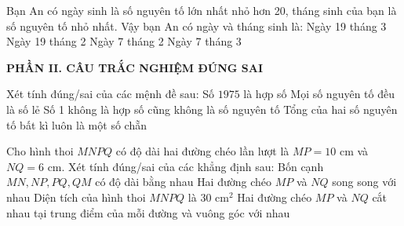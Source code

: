 \documentclass[12pt,a4paper]{article}
\begin{document}
\begin{ex}
Bạn An có ngày sinh là số nguyên tố lớn nhất nhỏ hơn 20, tháng sinh của bạn là số nguyên tố nhỏ nhất. Vậy bạn An có ngày và tháng sinh là:
\choice
{Ngày 19 tháng 3}
{\True Ngày 19 tháng 2}
{Ngày 7 tháng 2}
{Ngày 7 tháng 3}
\end{ex}


\setcounter{ex}{0}
\vspace{2mm}
\noindent\textbf{\large PHẦN II. CÂU TRẮC NGHIỆM ĐÚNG SAI}
\vspace{1mm}
\begin{ex}
Xét tính đúng/sai của các mệnh đề sau:
\choiceTF
{\True Số $1975$ là hợp số}
{Mọi số nguyên tố đều là số lẻ}
{\True Số 1 không là hợp số cũng không là số nguyên tố}
{Tổng của hai số nguyên tố bất kì luôn là một số chẵn}
\end{ex}

\begin{ex}
Cho hình thoi $MNPQ$ có độ dài hai đường chéo lần lượt là $MP = 10\text{ cm}$ và $NQ = 6\text{ cm}$. Xét tính đúng/sai của các khẳng định sau:
\choiceTF
{\True Bốn cạnh $MN, NP, PQ, QM$ có độ dài bằng nhau}
{Hai đường chéo $MP$ và $NQ$ song song với nhau}
{\True Diện tích của hình thoi $MNPQ$ là $30\text{ cm}^2$}
{\True Hai đường chéo $MP$ và $NQ$ cắt nhau tại trung điểm của mỗi đường và vuông góc với nhau}
\end{ex}
\end{document}
